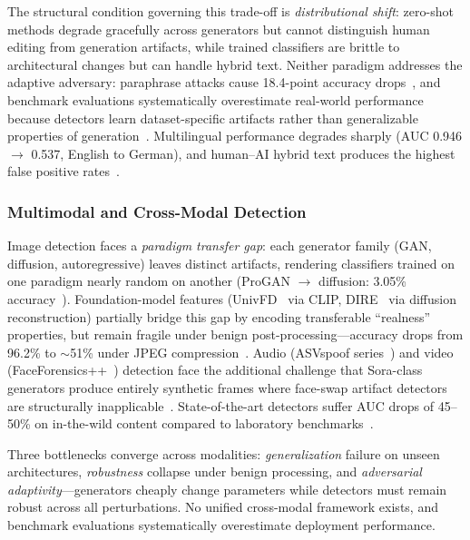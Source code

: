 The structural condition governing this trade-off is \emph{distributional shift}: zero-shot methods degrade gracefully across generators but cannot distinguish human editing from generation artifacts, while trained classifiers are brittle to architectural changes but can handle hybrid text. Neither paradigm addresses the adaptive adversary: paraphrase attacks cause 18.4-point accuracy drops~\cite{dugan2024raid}, and benchmark evaluations systematically overestimate real-world performance because detectors learn dataset-specific artifacts rather than generalizable properties of generation~\cite{macko2023multitude}. Multilingual performance degrades sharply (AUC 0.946 $\to$ 0.537, English to German), and human--AI hybrid text produces the highest false positive rates~\cite{turnitin2024}.

\subsubsection{Multimodal and Cross-Modal Detection}
\label{sec:detect-multimodal}

Image detection faces a \emph{paradigm transfer gap}: each generator family (GAN, diffusion, autoregressive) leaves distinct artifacts, rendering classifiers trained on one paradigm nearly random on another (ProGAN $\to$ diffusion: 3.05\% accuracy~\cite{ojha2023univfd}). Foundation-model features (UnivFD~\cite{ojha2023univfd} via CLIP, DIRE~\cite{wang2023dire} via diffusion reconstruction) partially bridge this gap by encoding transferable ``realness'' properties, but remain fragile under benign post-processing---accuracy drops from 96.2\% to $\sim$51\% under JPEG compression~\cite{zhu2023genimage}. Audio (ASVspoof series~\cite{asvspoof2019,asvspoof2021}) and video (FaceForensics++~\cite{rossler2019faceforensics}) detection face the additional challenge that Sora-class generators produce entirely synthetic frames where face-swap artifact detectors are structurally inapplicable~\cite{cai2024beyonddeepfake}. State-of-the-art detectors suffer AUC drops of 45--50\% on in-the-wild content compared to laboratory benchmarks~\cite{chandra2025deepfakeeval}.

Three bottlenecks converge across modalities: \emph{generalization} failure on unseen architectures, \emph{robustness} collapse under benign processing, and \emph{adversarial adaptivity}---generators cheaply change parameters while detectors must remain robust across all perturbations. No unified cross-modal framework exists, and benchmark evaluations systematically overestimate deployment performance.

